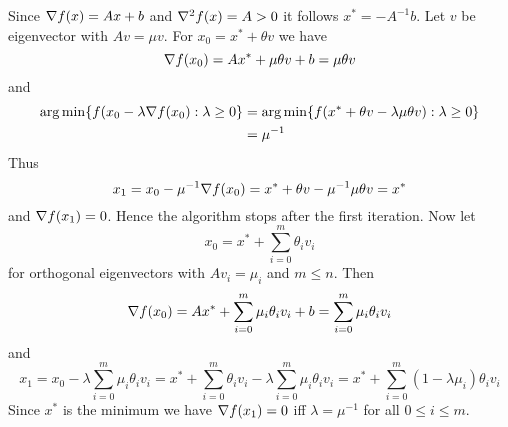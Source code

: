\proof{}
Since \( \nabla {f(x)} = Ax + b \) and \( \nabla^2 {f(x)} = A > 0 \) it follows \( x^* = -A^{-1}b \).
Let \( v \) be eigenvector with \( Av = \mu v \). For \( x_0 = x^* + \theta v \) we have
\[ 
    \nabla {f(x_0)} = Ax^* + \mu \theta v + b = \mu \theta v 
\] 
and 
\[
    \begin{split}
        \operatorname*{arg\,min} \{ f(x_0 - \lambda \nabla f(x_0) : \lambda \ge 0 \} 
            & = \operatorname*{arg\,min} \{ f(x^* + \theta v - \lambda \mu \theta v) : \lambda \ge 0 \} \\
            & = \mu^{-1} 
    \end{split}
\]
Thus         
\[
    x_1 = x_0 - \mu^{-1} \nabla f(x_0) = x^* + \theta v - \mu^{-1} \mu \theta v = x^*
\]
and \( \nabla {f(x_1)} = 0 \). Hence the algorithm stops after the first iteration.
Now let 
\[
    x_0 = x^* + \sum_{i=0}^m \theta_i v_i
\]
for orthogonal eigenvectors with \( Av_i = \mu_i\) and \( m \le n \). Then
\[ 
    \nabla {f(x_0)} = Ax^* + \sum_{i=0}^m \mu_i \theta_i v_i + b = \sum_{i=0}^m \mu_i \theta_i v_i
\]
and
\[ 
    x_1 = x_0 - \lambda \sum_{i=0}^m \mu_i \theta_i v_i 
        = x^* + \sum_{i=0}^m \theta_i v_i - \lambda \sum_{i=0}^m \mu_i \theta_i v_i
        = x^* + \sum_{i=0}^m (1 - \lambda \mu_i) \theta_i v_i
\]
Since \( x^* \) is the minimum we have \( \nabla {f(x_1)} = 0 \) iff \( \lambda = \mu^{-1} \) for all \( 0 \le i \le m \).
\bigskip
